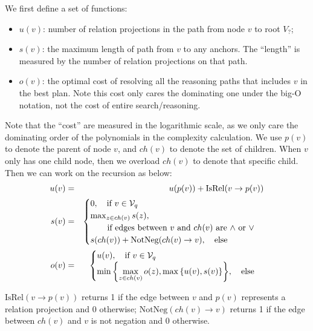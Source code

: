 We first define a set of functions:
\begin{itemize}[noitemsep,topsep=0pt,parsep=0pt,partopsep=0pt, leftmargin=*]
	\item $u(v)$: number of relation projections in the path from node $v$ to root $V_?$;
	\item $s(v)$: the maximum length of path from $v$ to any anchors. The ``length'' is measured by the number of relation projections on that path.
	\item $o(v)$: the optimal cost of resolving all the reasoning paths that includes $v$ in the best plan. Note this cost only cares the dominating one under the big-O notation, not the cost of entire search/reasoning.
\end{itemize}
Note that the ``cost'' are measured in the logarithmic scale, as we only care the dominating order of the polynomials in the complexity calculation. 
We use $p(v)$ to denote the parent of node $v$, and $ch(v)$ to denote the set of children. When $v$ only has one child node, then we overload $ch(v)$ to denote that specific child. Then we can work on the recursion as below:
\begin{eqnarray}
	u(v) &=& u(p(v)) + \text{IsRel}(v \rightarrow p(v)) \nonumber \\
	s(v) &=& \begin{cases}
     0, \quad \text{if }v \in \mathcal{V}_q \\
     \max_{z \in ch(v)} s(z), \quad \\
     \quad \quad \text{if edges between $v$ and $ch(v)$ are $\wedge$ or $\vee$} \nonumber \\
    s(ch(v)) + \text{NotNeg}(ch(v) \rightarrow v), \quad \text{else} \\
            \end{cases} \\
     o(v) &=& \begin{cases}
    u(v), \quad \text{if }v \in \mathcal{V}_q \nonumber \\
     {\displaystyle \min\left\{\max_{z \in ch(v)} o(z), \max\left\{u(v), s(v)\right\}\right\}}, \quad \text{else} \\
            \end{cases}
\end{eqnarray}

$\text{IsRel}(v\to p(v))$ returns 1 if the edge between $v$ and $p(v)$ represents a relation projection and 0 otherwise; $\text{NotNeg}(ch(v)\to v)$ returns 1 if the edge between $ch(v)$ and $v$ is not negation and 0 otherwise.

